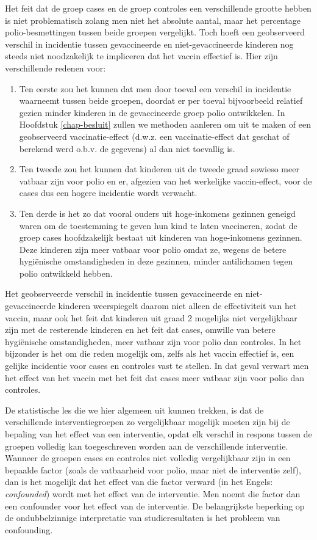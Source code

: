 \documentclass[
  12pt,dutch]{book}
\providecommand{\tightlist}{%
  \setlength{\itemsep}{0pt}\setlength{\parskip}{0pt}}
\theoremstyle{definition}
\theoremstyle{definition}
\theoremstyle{definition}
\theoremstyle{definition}
\theoremstyle{remark}
\begin{document}
Het feit dat de groep cases en de groep controles een verschillende grootte
hebben is niet problematisch zolang men niet het absolute aantal, maar het
percentage polio-besmettingen tussen beide groepen vergelijkt. Toch hoeft
een geobserveerd verschil in incidentie tussen gevaccineerde en
niet-gevaccineerde kinderen nog steeds niet noodzakelijk te impliceren dat
het vaccin effectief is. Hier zijn verschillende redenen voor:

\begin{enumerate}
\def\labelenumi{\arabic{enumi}.}
\tightlist
\item
  Ten eerste zou het kunnen dat men door toeval een verschil in
  incidentie waarneemt tussen beide groepen, doordat er per toeval
  bijvoorbeeld relatief gezien minder kinderen in de gevaccineerde groep polio
  ontwikkelen. In Hoofdstuk \ref{chap-besluit} zullen we methoden aanleren om
  uit te maken of een geobserveerd vaccinatie-effect (d.w.z. een
  vaccinatie-effect dat geschat of berekend werd o.b.v. de gegevens) al dan
  niet toevallig is.
\item
  Ten tweede zou het kunnen dat kinderen uit de tweede graad sowieso
  meer vatbaar zijn voor polio en er, afgezien van het werkelijke
  vaccin-effect, voor de cases dus een hogere incidentie wordt verwacht.
\item
  Ten derde is het zo dat vooral ouders uit hoge-inkomens gezinnen
  geneigd waren om de toestemming te geven hun kind te laten vaccineren, zodat
  de groep cases hoofdzakelijk bestaat uit kinderen van hoge-inkomens
  gezinnen. Deze kinderen zijn meer vatbaar voor polio omdat ze, wegens de
  betere hygiënische omstandigheden in deze gezinnen, minder antilichamen
  tegen polio ontwikkeld hebben.
\end{enumerate}

Het geobserveerde verschil in incidentie tussen gevaccineerde en
niet-gevaccineerde kinderen weerspiegelt daarom niet alleen de effectiviteit
van het vaccin, maar ook het feit dat kinderen uit graad 2 mogelijks niet
vergelijkbaar zijn met de resterende kinderen en het feit dat cases, omwille
van betere hygiënische omstandigheden, meer vatbaar zijn voor polio dan
controles. In het bijzonder is het om die reden mogelijk om, zelfs als het
vaccin effectief is, een gelijke incidentie voor cases en controles vast te
stellen. In dat geval verwart men het effect van het vaccin met het feit dat
cases meer vatbaar zijn voor polio dan controles.

De statistische les die we hier algemeen uit kunnen trekken, is dat de
verschillende interventiegroepen zo vergelijkbaar mogelijk moeten zijn bij
de bepaling van het effect van een interventie, opdat elk verschil in respons tussen
de groepen volledig kan toegeschreven worden aan de verschillende
interventie. Wanneer de groepen cases en controles niet volledig
vergelijkbaar zijn in een bepaalde factor (zoals de vatbaarheid voor polio,
maar niet de interventie zelf), dan is het mogelijk dat het effect van die
factor verward (in het Engels: \emph{confounded}) wordt met het effect van
de interventie. Men noemt die factor dan een confounder voor het effect van
de interventie. De belangrijkste beperking op de ondubbelzinnige interpretatie van studieresultaten is het probleem van confounding.
\end{document}
